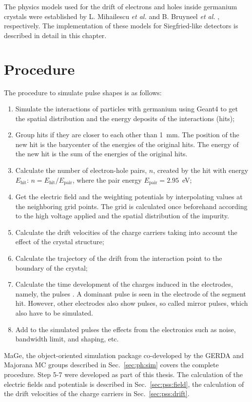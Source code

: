 The physics models used for the drift of electrons and holes inside
germanium crystals were established by L. Mihailescu \textit{et
al.}\cite{miha} and B. Bruyneel \emph{et al.} \cite{bart},
respectively. The implementation of these models for Siegfried-like
detectors is described in detail in this chapter.


\section{Procedure}
\label{sec:pss:proc}
The procedure to simulate pulse shapes \cite{agata} is as follows:
\begin{enumerate} 
\item Simulate the interactions of particles with germanium using
Geant4 to get the spatial distribution and the energy deposits of the
interactions (hits);
\item Group hits if they are closer to each other than 1~mm. The
position of the new hit is the barycenter of the energies of the
original hits. The energy of the new hit is the sum of the energies of
the original hits.
\item Calculate the number of electron-hole pairs, $n$, created by the
hit with energy $E_{\text{hit}}$: $n = E_{\text{hit}} /
E_{\text{pair}}$, where the pair energy $E_{\text{pair}} = 2.95$~eV;
\item Get the electric field and the weighting potentials by
interpolating values at the neighboring grid points. The grid is
calculated once beforehand according to the high voltage applied and
the spatial distribution of the impurity. \cite{Gat82, Rad88, He00}
\item Calculate the drift velocities of the charge carriers taking
into account the effect of the crystal structure;
\item Calculate the trajectory of the drift from the interaction point
to the boundary of the crystal;
\item Calculate the time development of the charges induced in the
electrodes, namely, the pulses \cite{igex}. A dominant pulse is seen
in the electrode of the segment hit. However, other electrodes also
show pulses, so called mirror pulses, which also have to be simulated.
\item Add to the simulated pulses the effects from the electronics
such as noise, bandwidth limit, and shaping, etc.
\end{enumerate} 
MaGe, the object-oriented simulation package co-developed by the GERDA
and Majorana MC groups described in Sec.~\ref{sec:ph:sim} covers the
complete procedure. Step 5-7 were developed as part of this
thesis. The calculation of the electric fields and potentials is
described in Sec.~\ref{sec:pss:field}, the calculation of the drift
velocities of the charge carriers in Sec.~\ref{sec:pss:drift}.
 
